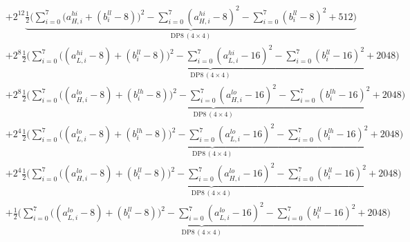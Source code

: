 \documentclass[fleqn]{article}
\newcommand{\DPop}[3]{\mathrm{DP#1}\,(#2\!\times\!#3)}
\begin{document}
\begin{align*}
  & + 2^{12}\underbrace{\tfrac12\Big(\sum_{i=0}^{7}\big(a_{H,i}^{hi}{+}(b_i^{ll}{-}8)\big)^2 - \sum_{i=0}^{7}(a_{H,i}^{hi}{-}8)^2 - \sum_{i=0}^{7}(b_i^{ll}{-}8)^2 + 512\Big)}_{\DPop{8}{4}{4}} \\[0.5em]
  & + 2^{8}\underbrace{\tfrac12\Big(\sum_{i=0}^{7}\big((a_{L,i}^{hi}{-}8){+}(b_i^{ll}{-}8)\big)^2 - \sum_{i=0}^{7}(a_{L,i}^{hi}{-}16)^2 - \sum_{i=0}^{7}(b_i^{ll}{-}16)^2 + 2048\Big)}_{\DPop{8}{4}{4}} \\[0.5em]
  & + 2^{8}\underbrace{\tfrac12\Big(\sum_{i=0}^{7}\big((a_{H,i}^{lo}{-}8){+}(b_i^{lh}{-}8)\big)^2 - \sum_{i=0}^{7}(a_{H,i}^{lo}{-}16)^2 - \sum_{i=0}^{7}(b_i^{lh}{-}16)^2 + 2048\Big)}_{\DPop{8}{4}{4}} \\[0.5em]
  & + 2^{4}\underbrace{\tfrac12\Big(\sum_{i=0}^{7}\big((a_{L,i}^{lo}{-}8){+}(b_i^{lh}{-}8)\big)^2 - \sum_{i=0}^{7}(a_{L,i}^{lo}{-}16)^2 - \sum_{i=0}^{7}(b_i^{lh}{-}16)^2 + 2048\Big)}_{\DPop{8}{4}{4}} \\[0.5em]
  & + 2^{4}\underbrace{\tfrac12\Big(\sum_{i=0}^{7}\big((a_{H,i}^{lo}{-}8){+}(b_i^{ll}{-}8)\big)^2 - \sum_{i=0}^{7}(a_{H,i}^{lo}{-}16)^2 - \sum_{i=0}^{7}(b_i^{ll}{-}16)^2 + 2048\Big)}_{\DPop{8}{4}{4}} \\[0.5em]
  & + \underbrace{\tfrac12\Big(\sum_{i=0}^{7}\big((a_{L,i}^{lo}{-}8){+}(b_i^{ll}{-}8)\big)^2 - \sum_{i=0}^{7}(a_{L,i}^{lo}{-}16)^2 - \sum_{i=0}^{7}(b_i^{ll}{-}16)^2 + 2048\Big)}_{\DPop{8}{4}{4}}
\end{align*}
\end{document}
